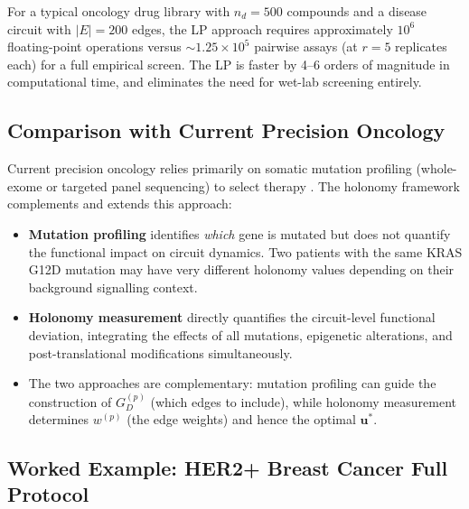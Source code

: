 For a typical oncology drug library with $n_d = 500$ compounds and a disease
circuit with $|E| = 200$ edges, the LP approach requires approximately $10^6$
floating-point operations versus $\sim 1.25 \times 10^5$ pairwise assays (at
$r = 5$ replicates each) for a full empirical screen.  The LP is faster by
4--6 orders of magnitude in computational time, and eliminates the need for
wet-lab screening entirely.

\subsection{Comparison with Current Precision Oncology}

Current precision oncology relies primarily on somatic mutation profiling
(whole-exome or targeted panel sequencing) to select therapy \citep{Garraway2013}.
The holonomy framework complements and extends this approach:

\begin{itemize}
  \item \textbf{Mutation profiling} identifies \emph{which} gene is mutated but
        does not quantify the functional impact on circuit dynamics.  Two
        patients with the same KRAS G12D mutation may have very different holonomy
        values depending on their background signalling context.
  \item \textbf{Holonomy measurement} directly quantifies the circuit-level
        functional deviation, integrating the effects of all mutations,
        epigenetic alterations, and post-translational modifications
        simultaneously.
  \item The two approaches are complementary: mutation profiling can guide the
        construction of $G_D^{(p)}$ (which edges to include), while holonomy
        measurement determines $w^{(p)}$ (the edge weights) and hence the
        optimal $\mathbf{u}^*$.
\end{itemize}

\subsection{Worked Example: HER2+ Breast Cancer Full Protocol}

